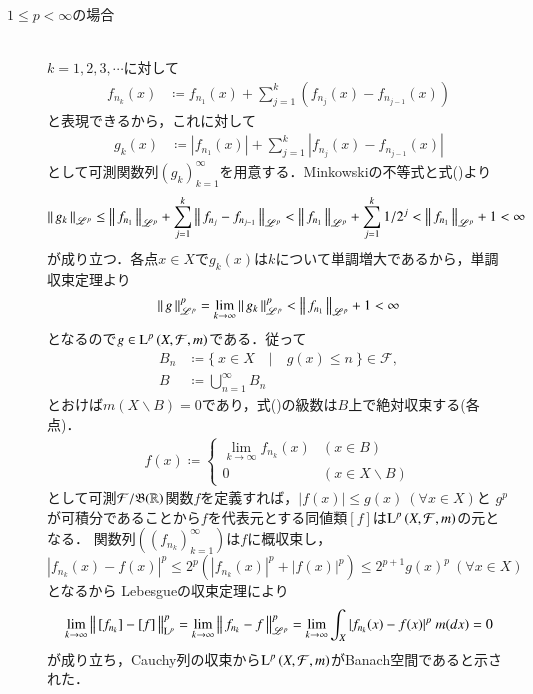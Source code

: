 \begin{qst}
\begin{prf}
\begin{description}
		\item[$1 \leq p < \infty$の場合]\mbox{}\\
			$k=1,2,3,\cdots$に対して
			\begin{align}	
				f_{n_k}(x) &\coloneqq f_{n_1}(x) + \sum_{j=1}^{k}(f_{n_j}(x) - f_{n_{j-1}}(x)) \label{eq:Lp_banach_3}
			\end{align}
			と表現できるから，これに対して
			\begin{align}
				g_k(x) &\coloneqq |f_{n_1}(x)| + \sum_{j=1}^{k}|f_{n_j}(x) - f_{n_{j-1}}(x)|
			\end{align}
			として可測関数列$(g_k)_{k=1}^{\infty}$を用意する．Minkowskiの不等式と式()より
			\begin{align}
				\left\|\, g_k\, \right\|_{\mathscr{L}^p} \leq \left\|\, f_{n_1}\, \right\|_{\mathscr{L}^p} + \sum_{j=1}^{k}\left\|\, f_{n_j} - f_{n_{j-1}}\, \right\|_{\mathscr{L}^p}
				< \left\|\, f_{n_1}\, \right\|_{\mathscr{L}^p} + \sum_{j=1}^{k} 1/2^j < \left\|\, f_{n_1}\, \right\|_{\mathscr{L}^p} + 1 < \infty
			\end{align}
			が成り立つ．各点$x \in X$で$g_k(x)$は$k$について単調増大であるから，単調収束定理より
			\begin{align}
				\left\|\, g\, \right\|_{\mathscr{L}^p}^p = \lim_{k \to \infty} \left\|\, g_k\, \right\|_{\mathscr{L}^p}^p < \left\|\, f_{n_1}\, \right\|_{\mathscr{L}^p} + 1 < \infty
			\end{align}
			となるので$g \in \operatorname{L}^{p} \left(X,\mathcal{F},m\right)$である．従って
			\begin{align}
				B_n &\coloneqq \{\ x \in X\quad |\quad g(x) \leq n\ \} \in \mathcal{F}, \\
				B &\coloneqq \bigcup_{n=1}^{\infty} B_n
			\end{align}
			とおけば$m(X \backslash B) = 0$であり，式()の級数は$B$上で絶対収束する(各点)．
			\begin{align}
				f(x) \coloneqq
				\begin{cases}
					\lim\limits_{k \to \infty} f_{n_k}(x) & (x \in B) \\
					0 & (x \in X \backslash B)
				\end{cases}
			\end{align}
			として可測$\mathcal{F}/\mathfrak{B}(\mathbb{R})$関数$f$を定義すれば，$|f(x)| \leq g(x)\ (\forall x \in X)$と
			$g^p$が可積分であることから$f$を代表元とする同値類$[f]$は$\operatorname{L}^{p} \left(X,\mathcal{F},m\right)$の元となる．
			関数列$(\left( f_{n_k} \right)_{k=1}^{\infty})$は$f$に概収束し，
			$|f_{n_k}(x) - f(x)|^p \leq 2^p(|f_{n_k}(x)|^p + |f(x)|^p) \leq 2^{p+1} g(x)^p\ (\forall x \in X)$となるから
			Lebesgueの収束定理により
			\begin{align}
				\lim_{k \to \infty}\Norm{[f_{n_k}] - [f]}{\mathrm{L}^p}^p
				= \lim_{k \to \infty}\Norm{f_{n_k} - f}{\mathscr{L}^p}^p
				= \lim_{k \to \infty} \int_X |f_{n_k}(x) - f(x)|^p\ m(dx) = 0
			\end{align}
			が成り立ち，Cauchy列の収束から$\operatorname{L}^{p} \left(X,\mathcal{F},m\right)$がBanach空間であると示された．
	\end{description}
\end{prf}

\end{qst}